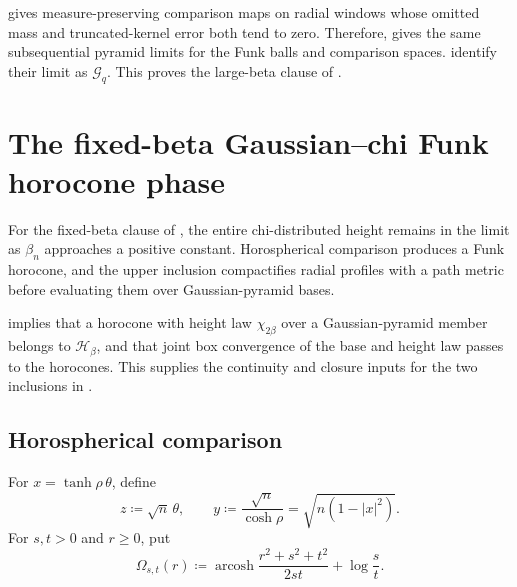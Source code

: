 \documentclass{amsart}
\numberwithin{equation}{section}
\theoremstyle{plain}
\theoremstyle{definition}
\theoremstyle{remark}
\DeclareMathOperator{\arcosh}{arcosh}
\begin{document}
 gives measure-preserving comparison maps on radial windows whose omitted mass and truncated-kernel error both tend to zero.  Therefore,  gives the same subsequential pyramid limits for the Funk balls and comparison spaces.   identify their limit as $\mathcal G_q$.
This proves the large-beta clause of .

\section{The fixed-beta Gaussian--chi Funk horocone phase}\label{sec:fixed-beta}

For the fixed-beta clause of , the entire chi-distributed height remains in the limit as $\beta_n$ approaches a positive constant.  Horospherical comparison produces a Funk horocone, and the upper inclusion compactifies radial profiles with a path metric before evaluating them over Gaussian-pyramid bases.

 implies that a horocone with height law $\chi_{2\beta}$ over a Gaussian-pyramid member belongs to $\mathcal H_\beta$, and that joint box convergence of the base and height law passes to the horocones.  This supplies the continuity and closure inputs for the two inclusions in .

\subsection{Horospherical comparison}

For $x=\tanh\rho\,\theta$, define
\begin{equation}\label{eq:horospherical-map} z\coloneqq\sqrt n\,\theta, \qquad y\coloneqq\frac{\sqrt n}{\cosh\rho} =\sqrt{n(1-|x|^2)}. \end{equation}
For $s,t>0$ and $r\ge0$, put
\begin{equation}\label{eq:upper-half-Funk} \Omega_{s,t}(r) \coloneqq\arcosh\frac{r^2+s^2+t^2}{2st}+\log\frac{s}{t}. \end{equation}
\end{document}
